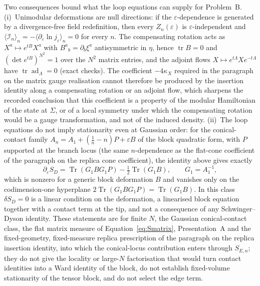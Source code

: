 Two consequences bound what the loop equations can supply for Problem~B. (i)~Unimodular deformations are null directions: if the \(\varepsilon\)-dependence is generated by a divergence-free field redefinition, then every \(Z_n(\varepsilon)\) is \(\varepsilon\)-independent and \(\langle\mathcal I_n\rangle_n=-\langle\partial_\varepsilon\ln j_\varepsilon\rangle_n=0\) for every \(n\). The compensating rotation acts as \(X^a\mapsto e^{tB}X^a\) with \(B^a{}_b=\partial_b\xi^a\) antisymmetric in \(\eta\), hence \(\operatorname{tr}B=0\) and \((\det e^{tB})^{N^2}=1\) over the \(N^2\) matrix entries, and the adjoint flows \(X\mapsto e^{t\Lambda}Xe^{-t\Lambda}\) have \(\operatorname{tr}\operatorname{ad}_\Lambda=0\) (exact checks). The coefficient \(-4\kappa_X\) required in the paragraph on the matrix gauge realisation cannot therefore be produced by the insertion identity along a compensating rotation or an adjoint flow, which sharpens the recorded conclusion that this coefficient is a property of the modular Hamiltonian of the state at \(\Sigma\), or of a local symmetry under which the compensating rotation would be a gauge transformation, and not of the induced density. (ii)~The loop equations do not imply stationarity even at Gaussian order: for the conical-contact family \(A_n=A_1+(\tfrac1n-n)P+\varepsilon B\) of the block quadratic form, with \(P\) supported at the branch locus (the same \(n\)-dependence as the flat-cone coefficient of the paragraph on the replica cone coefficient), the identity above gives exactly
\[
  \partial_\varepsilon S_D=\operatorname{Tr}(G_1BG_1P)-\tfrac12\operatorname{Tr}(G_1B),\qquad G_1=A_1^{-1},
\]
which is nonzero for a generic block deformation \(B\) and vanishes only on the codimension-one hyperplane \(2\operatorname{Tr}(G_1BG_1P)=\operatorname{Tr}(G_1B)\). In this class \(\delta S_D=0\) is a linear condition on the deformation, a linearised block equation together with a contact term at the tip, and not a consequence of any Schwinger--Dyson identity. These statements are for finite \(N\), the Gaussian conical-contact class, the flat matrix measure of Equation~\eqref{eq:Smatrix}, Presentation~A and the fixed-geometry, fixed-measure replica prescription of the paragraph on the replica insertion identity, into which the conical-locus contribution enters through \(S_{E,n}\); they do not give the locality or large-\(N\) factorisation that would turn contact identities into a Ward identity of the block, do not establish fixed-volume stationarity of the tensor block, and do not select the edge term.

